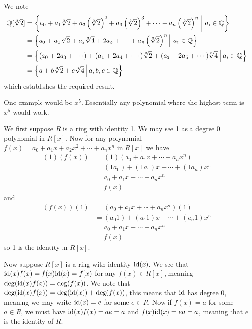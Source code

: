 \begin{questions}
    \item We note
    \begin{align*}
        \Q[\sqrt[3]{2}] &= \left\{a_0 + a_1\sqrt[3]{2} + a_2\left(\sqrt[3]{2}\right)^2 + a_3\left(\sqrt[3]{2}\right)^3 + \cdots + a_n\left(\sqrt[3]{2}\right)^n \vert a_i \in \Q\right\}\\
        &= \left\{a_0 + a_1\sqrt[3]{2} + a_2\sqrt[3]{4} + 2a_3 + \cdots + a_n\left(\sqrt[3]{2}\right)^n \vert a_i \in \Q\right\}\\
        &= \left\{(a_0 + 2a_3 + \cdots) + (a_1 + 2a_4 + \cdots)\sqrt[3]{2} + (a_2 + 2a_5 + \cdots)\sqrt[3]{4} \vert a_i \in \Q\right\}\\
        &= \left\{a + b\sqrt[3]{2} + c\sqrt[3]{4} \vert a,b,c \in \Q\right\}
    \end{align*}
    which establishes the required result.

    \item One example would be $x^5$. Essentially any polynomial where the highest term is $x^5$ would work.
    
    \item \begin{partquestions}{\alph*}
        \item We first suppose $R$ is a ring with identity 1. We may see 1 as a degree 0 polynomial in $R[x]$. Now for any polynomial $f(x) = a_0+a_1x+a_2x^2+\cdots+a_nx^n$ in $R[x]$ we have
        \begin{align*}
            (1)(f(x)) &= (1)(a_0+a_1x+\cdots+a_nx^n)\\
            &= (1a_0)+(1a_1)x+\cdots+(1a_n)x^n\\
            &= a_0+a_1x+\cdots+a_nx^n\\
            &= f(x)
        \end{align*}
        and
        \begin{align*}
            (f(x))(1) &= (a_0+a_1x+\cdots+a_nx^n)(1)\\
            &= (a_{0}1)+(a_{1}1)x+\cdots+(a_{n}1)x^n\\
            &= a_0+a_1x+\cdots+a_nx^n\\
            &= f(x)
        \end{align*}
        so 1 is the identity in $R[x]$.

        Now suppose $R[x]$ is a ring with identity $\mathrm{id}(x)$. We see that $\mathrm{id}(x)f(x) = f(x)\mathrm{id}(x) = f(x)$ for any $f(x) \in R[x]$, meaning $\deg(\mathrm{id}(x)f(x)) = \deg(f(x))$. We note that $\deg(\mathrm{id}(x)f(x)) = \deg(\mathrm{id}(x)) + \deg(f(x))$, this means that $\mathrm{id}$ has degree 0, meaning we may write $\mathrm{id}(x) = e$ for some $e \in R$. Now if $f(x) = a$ for some $a \in R$, we must have $\mathrm{id}(x)f(x) = ae = a$ and $f(x)\mathrm{id}(x) = ea = a$, meaning that $e$ is the identity of $R$.
        

\end{partquestions}
\end{questions}
